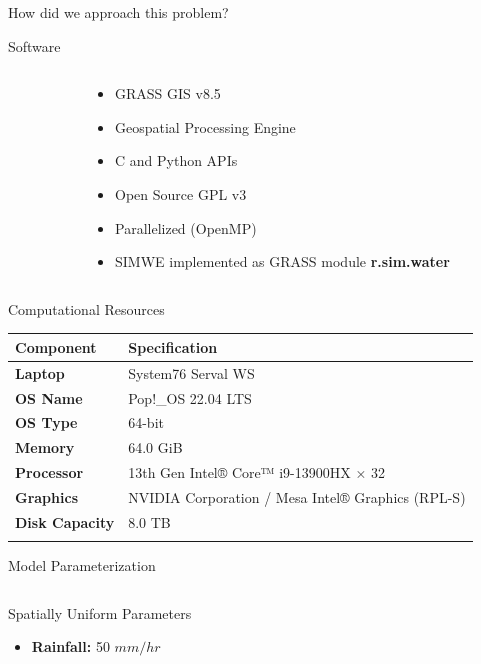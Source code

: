 \documentclass[
  ignorenonframetext,
]{beamer}
\providecommand{\tightlist}{%
  \setlength{\itemsep}{0pt}\setlength{\parskip}{0pt}}\usepackage{longtable,booktabs,array}
\begin{document}
\begin{frame}[fragile]{How did we approach this problem?}
\label{how-did-we-approach-this-problem}
\begin{block}{Software}
\label{software}
\begin{columns}[T]
\begin{column}{0.4\textwidth}
\end{column}

\begin{column}{0.6\textwidth}
\begin{itemize}
\item
  GRASS GIS v8.5
\item
  Geospatial Processing Engine
\item
  C and Python APIs
\item
  Open Source GPL v3
\item
  Parallelized (OpenMP)
\item
  SIMWE implemented as GRASS module \textbf{r.sim.water}
\end{itemize}
\end{column}
\end{columns}
\end{block}

\begin{block}{Computational Resources}
\label{computational-resources}
\begin{longtable}[]{@{}ll@{}}
\toprule\noalign{}
\textbf{Component} & \textbf{Specification} \\
\midrule\noalign{}
\endhead
\textbf{Laptop} & System76 Serval WS \\
\textbf{OS Name} & Pop!\_OS 22.04 LTS \\
\textbf{OS Type} & 64-bit \\
\textbf{Memory} & 64.0 GiB \\
\textbf{Processor} & 13th Gen Intel® Core™ i9-13900HX × 32 \\
\textbf{Graphics} & NVIDIA Corporation / Mesa Intel® Graphics (RPL-S) \\
\textbf{Disk Capacity} & 8.0 TB \\
\bottomrule\noalign{}
\end{longtable}
\end{block}

\begin{block}{Model Parameterization}
\label{model-parameterization}
\begin{columns}[T]
\begin{column}{0.5\textwidth}
\begin{block}{Spatially Uniform Parameters}
\label{spatially-uniform-parameters}
\begin{itemize}
\tightlist
\item
  \textbf{Rainfall:} 50 \(mm/hr\)
\end{itemize}


\end{block}
\end{column}
\end{columns}
\end{block}
\end{frame}
\end{document}

